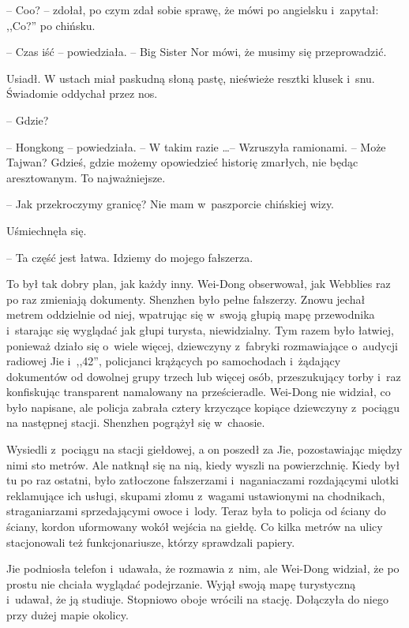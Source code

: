 \documentclass[oneside,polish,11pt,rmheadings]{mwbk}
\begin{document}
-- Coo? -- zdołał, po czym zdał sobie sprawę, że mówi po angielsku i~zapytał: ,,Co?'' po chińsku.

-- Czas iść -- powiedziała. -- Big Sister Nor mówi, że musimy się przeprowadzić.

Usiadł. W ustach miał paskudną słoną pastę, nieświeże resztki klusek i~snu. Świadomie oddychał przez nos.

-- Gdzie? 

-- Hongkong -- powiedziała. -- W takim razie \ldots  -- Wzruszyła ramionami. -- Może Tajwan? Gdzieś, gdzie możemy opowiedzieć historię zmarłych, nie będąc aresztowanym. To najważniejsze.

-- Jak przekroczymy granicę? Nie mam w~paszporcie chińskiej wizy.

Uśmiechnęła się. 

-- Ta część jest łatwa. Idziemy do mojego fałszerza.

To był tak dobry plan, jak każdy inny. Wei-Dong obserwował, jak Webblies raz po raz zmieniają dokumenty. Shenzhen było pełne fałszerzy. Znowu jechał metrem oddzielnie od niej, wpatrując się w~swoją głupią mapę przewodnika i~starając się wyglądać jak głupi turysta, niewidzialny. Tym razem było łatwiej, ponieważ działo się o~wiele więcej, dziewczyny z~fabryki rozmawiające o~audycji radiowej Jie i~,,42'', policjanci krążących po samochodach i~żądający dokumentów od dowolnej grupy trzech lub więcej osób, przeszukujący torby i~raz konfiskując transparent namalowany na prześcieradle. Wei-Dong nie widział, co było napisane, ale policja zabrała cztery krzyczące kopiące dziewczyny z~pociągu na następnej stacji. Shenzhen pogrążył się w~chaosie.

Wysiedli z~pociągu na stacji giełdowej, a on poszedł za Jie, pozostawiając między nimi sto metrów. Ale natknął się na nią, kiedy wyszli na powierzchnię. Kiedy był tu po raz ostatni, było zatłoczone fałszerzami i~naganiaczami rozdającymi ulotki reklamujące ich usługi, skupami złomu z~wagami ustawionymi na chodnikach, straganiarzami sprzedającymi owoce i~lody. Teraz była to policja od ściany do ściany, kordon uformowany wokół wejścia na giełdę. Co kilka metrów na ulicy stacjonowali też funkcjonariusze, którzy sprawdzali papiery.

Jie podniosła telefon i~udawała, że rozmawia z~nim, ale Wei-Dong widział, że po prostu nie chciała wyglądać podejrzanie. Wyjął swoją mapę turystyczną i~udawał, że ją studiuje. Stopniowo oboje wrócili na stację. Dołączyła do niego przy dużej mapie okolicy.
\end{document}
